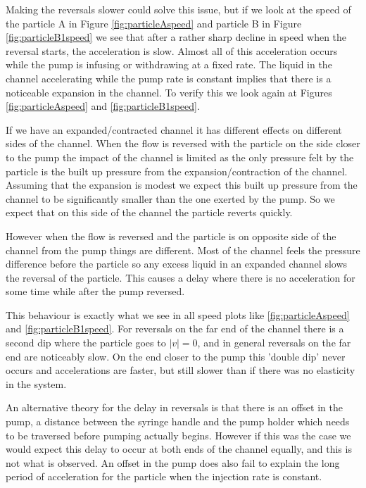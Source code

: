 Making the reversals slower could solve this issue, but if we look at the speed of the particle A in Figure \ref{fig:particleAspeed} and particle B in Figure \ref{fig:particleB1speed} we see that after a rather 
sharp decline in speed when the reversal starts, the acceleration is slow. Almost all of this acceleration occurs while the pump is 
infusing or withdrawing at a fixed rate. The liquid in the channel accelerating while the pump rate is constant implies that there 
is a noticeable expansion in the channel. To verify this we look again at Figures
\ref{fig:particleAspeed} and \ref{fig:particleB1speed}.

If we have an expanded/contracted channel it has different effects on different sides of the channel. When the flow is reversed with the particle on the side closer to the pump the impact of the channel is limited as the only pressure felt by the particle is the built up pressure from the expansion/contraction of the channel. Assuming that the expansion is modest we expect this built up pressure from the channel to be significantly smaller than the one exerted by the pump. So we expect that on this side of the channel the particle reverts quickly.

However when the flow is reversed and the particle is on opposite side of the channel from the pump things are different. Most of the channel feels the pressure difference before the particle so any excess liquid in an expanded channel slows the reversal of the particle. This causes a delay where there is no acceleration for some time while after the pump reversed. 

This behaviour is exactly what we see in all speed plots like \ref{fig:particleAspeed} and \ref{fig:particleB1speed}. 
For reversals on the far end of the channel there is a second dip where the particle goes to $\left|v\right|=0$, and in general reversals on the far end are noticeably slow. On the end closer to the pump this 'double dip' never occurs and accelerations are faster, but still slower than if there was no elasticity in the system.

An alternative theory for the delay in reversals is that there is an offset in the pump, a distance between the syringe handle and the pump holder which needs to be traversed before pumping actually begins. However if this was the case we would expect this delay to occur at both ends of the channel equally, and this is not what is observed. An offset in the pump does also fail to explain the long period of acceleration for the particle when the injection rate is constant.

